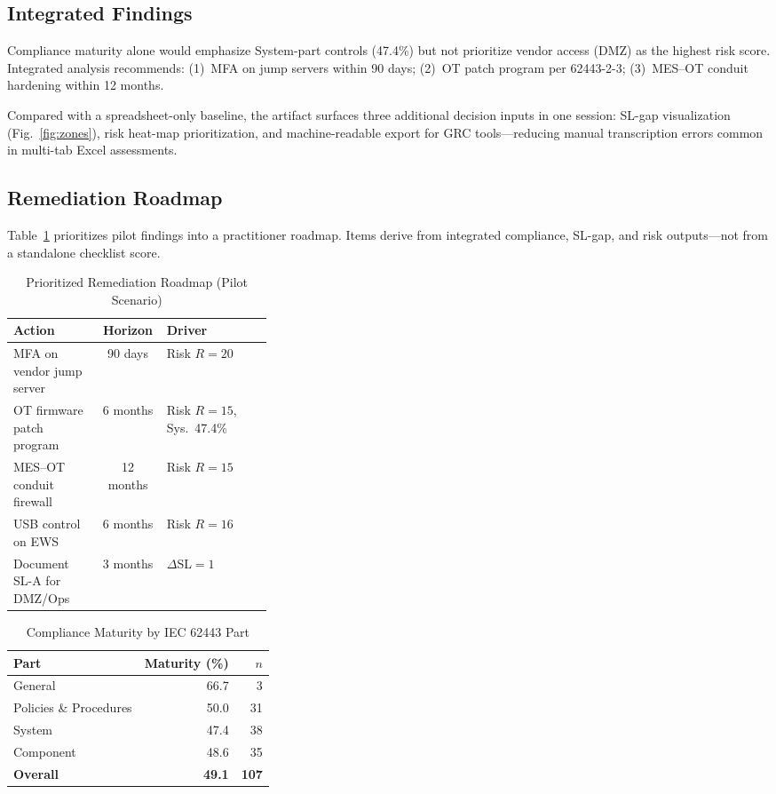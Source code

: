 \documentclass[10pt,conference]{IEEEtran}
\begin{document}
\subsection{Integrated Findings}
Compliance maturity alone would emphasize System-part controls (47.4\%) but not prioritize vendor access (DMZ) as the highest risk score. Integrated analysis recommends: (1)~MFA on jump servers within 90 days; (2)~OT patch program per 62443-2-3; (3)~MES--OT conduit hardening within 12 months.

Compared with a spreadsheet-only baseline, the artifact surfaces three additional decision inputs in one session: SL-gap visualization (Fig.~\ref{fig:zones}), risk heat-map prioritization, and machine-readable export for GRC tools---reducing manual transcription errors common in multi-tab Excel assessments.

\subsection{Remediation Roadmap}
Table~\ref{tab:roadmap} prioritizes pilot findings into a practitioner roadmap. Items derive from integrated compliance, SL-gap, and risk outputs---not from a standalone checklist score.

\begin{table}[!t]
\caption{Prioritized Remediation Roadmap (Pilot Scenario)}
\label{tab:roadmap}
\centering
\small
\begin{tabular}{p{0.34\linewidth}cl}
\hline
Action & Horizon & Driver \\
\hline
MFA on vendor jump server & 90 days & Risk $R{=}20$ \\
OT firmware patch program & 6 months & Risk $R{=}15$, Sys.~47.4\% \\
MES--OT conduit firewall & 12 months & Risk $R{=}15$ \\
USB control on EWS & 6 months & Risk $R{=}16$ \\
Document SL-A for DMZ/Ops & 3 months & $\Delta$SL$=1$ \\
\hline
\end{tabular}
\end{table}

\begin{table}[!t]
\caption{Compliance Maturity by IEC 62443 Part}
\label{tab:maturity}
\centering
\begin{tabular}{lrr}
\hline
Part & Maturity (\%) & $n$ \\
\hline
General & 66.7 & 3 \\
Policies \& Procedures & 50.0 & 31 \\
System & 47.4 & 38 \\
Component & 48.6 & 35 \\
\hline
\textbf{Overall} & \textbf{49.1} & \textbf{107} \\
\hline
\end{tabular}
\end{table}
\end{document}
